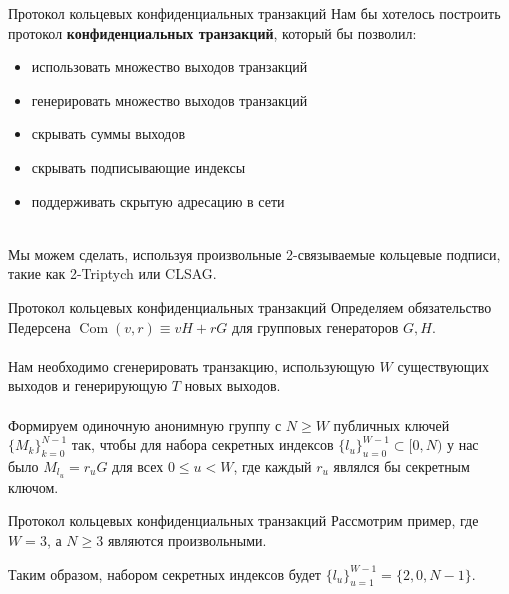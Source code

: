 \documentclass[aspectratio=169]{beamer}
\newcommand{\com}{\operatorname{Com}}
\begin{document}
\begin{frame}{Протокол кольцевых конфиденциальных транзакций}
Нам бы хотелось построить протокол \textbf{конфиденциальных транзакций}, который бы позволил:
\begin{itemize}
\item использовать множество выходов транзакций
\item генерировать множество выходов транзакций
\item скрывать суммы выходов
\item скрывать подписывающие индексы
\item поддерживать скрытую адресацию в сети
\end{itemize}
~\\
Мы можем сделать, используя произвольные 2-связываемые кольцевые подписи, такие как 2-Triptych или CLSAG.
\end{frame}


\begin{frame}{Протокол кольцевых конфиденциальных транзакций}
Определяем обязательство Педерсена $\com(v,r) \equiv vH + rG$ для групповых генераторов $G,H$.
\\~\\
Нам необходимо сгенерировать транзакцию, использующую $W$ существующих выходов и генерирующую $T$ новых выходов.
\\~\\
Формируем одиночную анонимную группу с $N \geq W$ публичных ключей $\{M_k\}_{k=0}^{N-1}$ так, чтобы для набора секретных индексов $\{l_u\}_{u=0}^{W-1} \subset [0,N)$ у нас было $M_{l_u} = r_uG$ для всех $0 \leq u < W$, где каждый $r_u$ являлся бы секретным ключом.
\end{frame}


\begin{frame}{Протокол кольцевых конфиденциальных транзакций}
Рассмотрим пример, где $W = 3$, а $N \geq 3$ являются произвольными.

\begin{center}
\end{center}

Таким образом, набором секретных индексов будет $\{l_u\}_{u=1}^{W-1} = \{2, 0, N-1\}$.
\end{frame}
\end{document}
